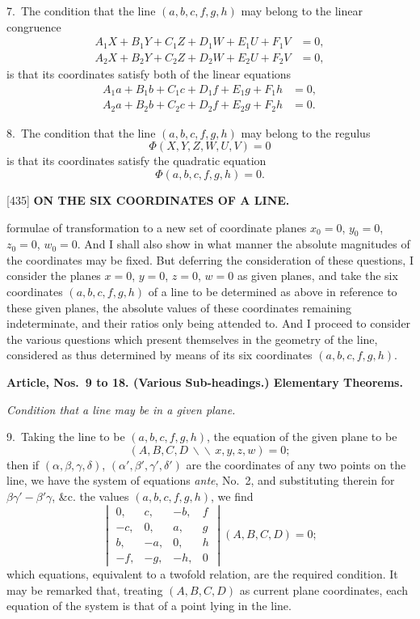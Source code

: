 \documentclass[12pt,a4paper]{article}
\newcommand{\paperref}[1]{\textup{[#1]}}
\theoremstyle{definition}
\begin{document}
7.~The condition that the line $(a, b, c, f, g, h)$ may belong to the linear congruence
\begin{align*}
A_1 X + B_1 Y + C_1 Z + D_1 W + E_1 U + F_1 V &= 0,\\
A_2 X + B_2 Y + C_2 Z + D_2 W + E_2 U + F_2 V &= 0,
\end{align*}
is that its coordinates satisfy both of the linear equations
\begin{align*}
A_1 a + B_1 b + C_1 c + D_1 f + E_1 g + F_1 h &= 0,\\
A_2 a + B_2 b + C_2 c + D_2 f + E_2 g + F_2 h &= 0.
\end{align*}

8.~The condition that the line $(a, b, c, f, g, h)$ may belong to the regulus
\[
\Phi(X, Y, Z, W, U, V) = 0
\]
is that its coordinates satisfy the quadratic equation
\[
\Phi(a, b, c, f, g, h) = 0.
\]

\newpage
\setcounter{page}{69}

\noindent\paperref{435}\quad
\textbf{ON THE SIX COORDINATES OF A LINE.}

formulae of transformation to a new set of coordinate planes $x_0 = 0$, $y_0 = 0$, $z_0 = 0$, $w_0 = 0$. And I shall also show in what manner the absolute magnitudes of the coordinates may be fixed. But deferring the consideration of these questions, I consider the planes $x = 0$, $y = 0$, $z = 0$, $w = 0$ as given planes, and take the six coordinates $(a, b, c, f, g, h)$ of a line to be determined as above in reference to these given planes, the absolute values of these coordinates remaining indeterminate, and their ratios only being attended to. And I proceed to consider the various questions which present themselves in the geometry of the line, considered as thus determined by means of its six coordinates $(a, b, c, f, g, h)$.

\smallskip
\textbf{Article, Nos.~9 to 18. (Various Sub-headings.) Elementary Theorems.}

\smallskip
\textit{Condition that a line may be in a given plane.}

9.~Taking the line to be $(a, b, c, f, g, h)$, the equation of the given plane to be
\[
(A, B, C, D \,\backslash\!\!\backslash\, x, y, z, w) = 0;
\]
then if $(\alpha, \beta, \gamma, \delta)$, $(\alpha', \beta', \gamma', \delta')$ are the coordinates of any two points on the line, we have the system of equations \textit{ante}, No.~2, and substituting therein for $\beta\gamma' - \beta'\gamma$, \&c. the values $(a, b, c, f, g, h)$, we find
\[
\begin{vmatrix}
0, & c, & -b, & f \\
-c, & 0, & a, & g \\
b, & -a, & 0, & h \\
-f, & -g, & -h, & 0
\end{vmatrix}
(A, B, C, D) = 0;
\]
which equations, equivalent to a twofold relation, are the required condition. It may be remarked that, treating $(A, B, C, D)$ as current plane coordinates, each equation of the system is that of a point lying in the line.
\end{document}
